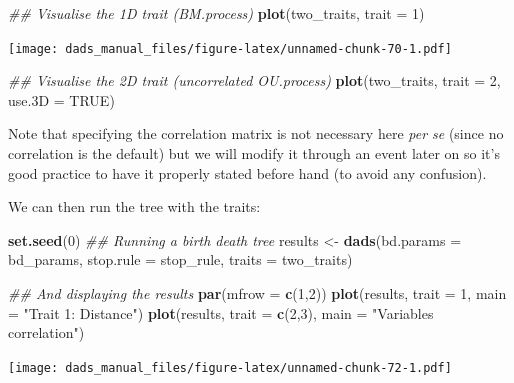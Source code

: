\documentclass[]{book}
\newenvironment{Shaded}{\begin{snugshade}}{\end{snugshade}}
\newcommand{\CommentTok}[1]{\textcolor[rgb]{0.56,0.35,0.01}{\textit{#1}}}
\newcommand{\DataTypeTok}[1]{\textcolor[rgb]{0.13,0.29,0.53}{#1}}
\newcommand{\DecValTok}[1]{\textcolor[rgb]{0.00,0.00,0.81}{#1}}
\newcommand{\KeywordTok}[1]{\textcolor[rgb]{0.13,0.29,0.53}{\textbf{#1}}}
\newcommand{\NormalTok}[1]{#1}
\newcommand{\OtherTok}[1]{\textcolor[rgb]{0.56,0.35,0.01}{#1}}
\newcommand{\StringTok}[1]{\textcolor[rgb]{0.31,0.60,0.02}{#1}}
\begin{document}
\begin{Shaded}
\begin{Highlighting}[]
\CommentTok{## Visualise the 1D trait (BM.process)}
\KeywordTok{plot}\NormalTok{(two_traits, }\DataTypeTok{trait =} \DecValTok{1}\NormalTok{)}
\end{Highlighting}
\end{Shaded}

\texttt{[image: dads\_manual\_files/figure-latex/unnamed-chunk-70-1.pdf]}

\begin{Shaded}
\begin{Highlighting}[]
\CommentTok{## Visualise the 2D trait (uncorrelated OU.process)}
\KeywordTok{plot}\NormalTok{(two_traits, }\DataTypeTok{trait =} \DecValTok{2}\NormalTok{, }\DataTypeTok{use.3D =} \OtherTok{TRUE}\NormalTok{)}
\end{Highlighting}
\end{Shaded}

Note that specifying the correlation matrix is not necessary here \emph{per se} (since no correlation is the default) but we will modify it through an event later on so it's good practice to have it properly stated before hand (to avoid any confusion).

We can then run the tree with the traits:

\begin{Shaded}
\begin{Highlighting}[]
\KeywordTok{set.seed}\NormalTok{(}\DecValTok{0}\NormalTok{)}
\CommentTok{## Running a birth death tree }
\NormalTok{results <-}\StringTok{ }\KeywordTok{dads}\NormalTok{(}\DataTypeTok{bd.params  =}\NormalTok{ bd_params,}
                \DataTypeTok{stop.rule  =}\NormalTok{ stop_rule,}
                \DataTypeTok{traits     =}\NormalTok{ two_traits)}

\CommentTok{## And displaying the results}
\KeywordTok{par}\NormalTok{(}\DataTypeTok{mfrow =} \KeywordTok{c}\NormalTok{(}\DecValTok{1}\NormalTok{,}\DecValTok{2}\NormalTok{))}
\KeywordTok{plot}\NormalTok{(results, }\DataTypeTok{trait =} \DecValTok{1}\NormalTok{, }\DataTypeTok{main =} \StringTok{"Trait 1: Distance"}\NormalTok{)}
\KeywordTok{plot}\NormalTok{(results, }\DataTypeTok{trait =} \KeywordTok{c}\NormalTok{(}\DecValTok{2}\NormalTok{,}\DecValTok{3}\NormalTok{), }\DataTypeTok{main =} \StringTok{"Variables correlation"}\NormalTok{)}
\end{Highlighting}
\end{Shaded}

\texttt{[image: dads\_manual\_files/figure-latex/unnamed-chunk-72-1.pdf]}
\end{document}
